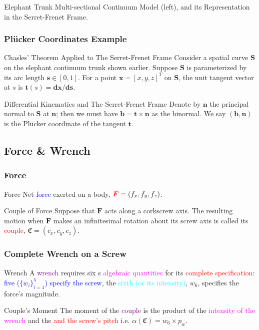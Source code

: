 \begin{frame}
\begin{columns}[]
\begin{column}{.68\linewidth}
		\end{column}
	\end{columns}
	\footnotesize{Elephant Trunk Multi-sectional Continuum Model (left), and its Representation in the Serret-Frenet Frame.}
\end{frame}
\begin{frame}
	\frametitle{Pl{\"u}cker Coordinates Example}
	\begin{block}{Chasles' Theorem Applied to The Serret-Frenet Frame}
		Consider a spatial curve $\bm{S}$ on the elephant continuum trunk shown earlier. Suppose $\bm{S}$ is parameterized by its arc length $\bm{s} \in [0, 1]$. 
		For a point $\bm{x}=\left[x, y, z\right]^T$ on $\bm{S}$, the unit tangent vector at $s$ is $\bm{t}(s)=\bm{dx}/\bm{ds}$.
	\end{block}
	\begin{block}{Differential Kinematics and The Serret-Frenet Frame}
		 Denote by $\bm{n}$ the principal normal to $\bm{S}$ at $\bm{n}$; then we must have $\bm{b}=\bm{t}\times \bm{n}$ as the binormal. We say $(\bm{b},\bm{n})$ is the Pl{\"u}cker coordinate of the tangent $\bm{t}$.
	\end{block}
\end{frame}

\subsection{Force \& Wrench}
\begin{frame}
	\frametitle{Force}
	\begin{block}{Force}
		Net \textcolor{blue}{force} exerted on a body, 
		$\textcolor{red}{\bm{F}} = (f_x, f_y, f_z)$.
	\end{block}
	\begin{block}{Couple of Force}
		Suppose that $\bm{F}$ acts along a corkscrew axis. The resulting motion when $\bm{F}$ makes an infinitesimal rotation about its screw axis  is called its \textcolor{red}{couple}, $\mathfrak{C} = (c_x, c_y, c_z)$.
	\end{block}
\end{frame}

\begin{frame}
	\frametitle{Complete Wrench on a Screw}
	\begin{block}{Wrench}		
		A \textcolor{purple}{wrench} requires six 
		s \textcolor{magenta}{algebraic quantities} for its  \textcolor{red}{complete specification}:  \textcolor{blue}{five ($\{w_i\}_{i=1}^5$) specify the screw}, the \textcolor{cyan}{sixth (or its intensity)}, $w_6$, specifies the \textcolor{light-blue}{force's magnitude}.
	\end{block}
	\begin{block}{Couple's Moment}		
		The moment of the \textcolor{purple}{couple} is the product of the \textcolor{magenta}{intensity of the wrench} and the \textcolor{red}{ and the screw's pitch} i.e. $\alpha(\mathfrak{C}) = w_6 \times p_w$.
	\end{block}
\end{frame}

